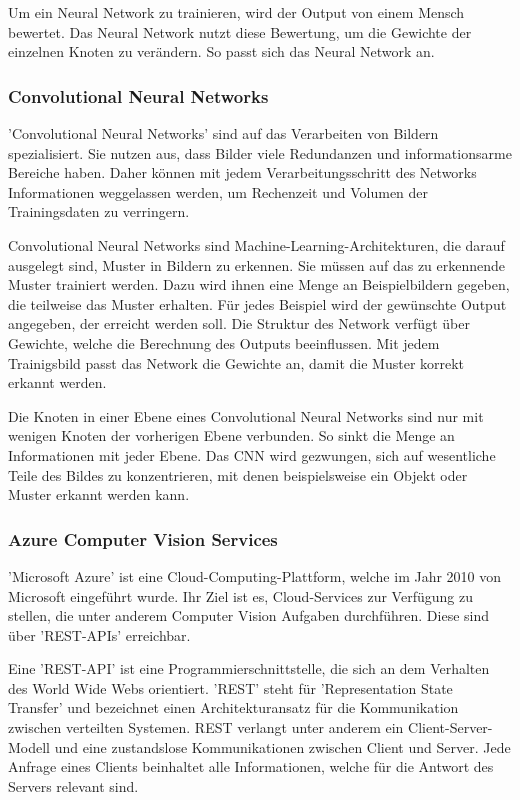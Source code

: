 Um ein Neural Network zu trainieren, wird der Output von einem Mensch bewertet. Das Neural Network nutzt diese Bewertung, um die Gewichte der einzelnen Knoten zu verändern. So passt sich das Neural Network an. \citep{introToCNN,surveyOfDeepLearing}

\subsubsection{Convolutional Neural Networks}
'Convolutional Neural Networks' sind auf das Verarbeiten von Bildern spezialisiert. Sie nutzen aus, dass Bilder viele Redundanzen und informationsarme Bereiche haben. Daher können mit jedem Verarbeitungsschritt des Networks Informationen weggelassen werden, um Rechenzeit und Volumen der Trainingsdaten zu verringern.\citep{introToCNN,surveyOfDeepLearing,cNNforClass}

Convolutional Neural Networks sind Machine-Learning-Architekturen, die darauf ausgelegt sind, Muster in Bildern zu erkennen. Sie müssen auf das zu erkennende Muster trainiert werden. Dazu wird ihnen eine Menge an Beispielbildern gegeben, die teilweise das Muster erhalten. Für jedes Beispiel wird der gewünschte Output angegeben, der erreicht werden soll. Die Struktur des Network verfügt über Gewichte, welche die Berechnung des Outputs beeinflussen. Mit jedem Trainigsbild passt das Network die Gewichte an, damit die Muster korrekt erkannt werden.\citep{introToCNN,surveyOfDeepLearing}

Die Knoten in einer Ebene eines Convolutional Neural Networks sind nur mit wenigen Knoten der vorherigen Ebene verbunden. So sinkt die Menge an Informationen mit jeder Ebene. Das CNN wird gezwungen, sich auf wesentliche Teile des Bildes zu konzentrieren, mit denen beispielsweise ein Objekt oder  Muster erkannt werden kann. \citep{introToCNN,surveyOfDeepLearing}

\subsubsection{Azure Computer Vision Services}

'Microsoft Azure' ist eine Cloud-Computing-Plattform, welche im Jahr 2010 von Microsoft eingeführt wurde. Ihr Ziel ist es, Cloud-Services zur Verfügung zu stellen, die unter anderem Computer Vision Aufgaben durchführen. Diese sind über 'REST-APIs' erreichbar. 

Eine 'REST-API' ist eine Programmierschnittstelle, die sich an dem Verhalten des World Wide Webs orientiert. 'REST' steht für 'Representation State Transfer' und bezeichnet einen Architekturansatz für die Kommunikation zwischen verteilten Systemen. REST verlangt unter anderem ein Client-Server-Modell und eine zustandslose Kommunikationen zwischen Client und Server. Jede Anfrage eines Clients beinhaltet alle Informationen, welche für die Antwort des Servers relevant sind.

